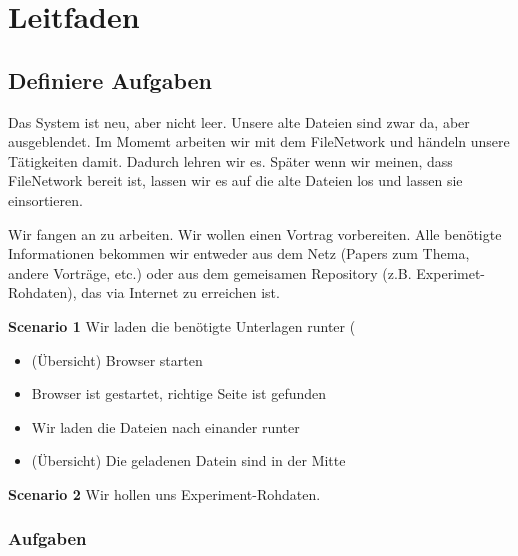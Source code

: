 
\def\mytitle{Leitfaden für User Study}
\def\myauthor{Anastasia Kazakova, Bengt Lüers}
\def\latexmode{memoir}
\def\bibliocommand{}
\def\bibliostyle{chicago}

\pagebreak

\chapter{Leitfaden}
\label{leitfaden}

\section{Definiere Aufgaben}
\label{definiereaufgaben}

Das System ist neu, aber nicht leer. Unsere alte Dateien sind zwar da, aber ausgeblendet. Im Momemt arbeiten wir mit dem FileNetwork und händeln unsere Tätigkeiten damit. Dadurch lehren wir es. Später wenn wir meinen, dass FileNetwork bereit ist, lassen wir es auf die alte Dateien los und lassen sie einsortieren. 

Wir fangen an zu arbeiten. Wir wollen einen Vortrag vorbereiten. Alle benötigte Informationen bekommen wir entweder aus dem Netz (Papers zum Thema, andere Vorträge, etc.) oder aus dem gemeisamen Repository (z.B. Experimet-Rohdaten), das via Internet zu erreichen ist.

\textbf{Scenario 1}
Wir laden die benötigte Unterlagen runter (

\begin{itemize}
\item (Übersicht) Browser starten

\item Browser ist gestartet, richtige Seite ist gefunden

\item Wir laden die Dateien nach einander runter

\item (Übersicht) Die geladenen Datein sind in der Mitte

\end{itemize}

\textbf{Scenario 2}
Wir hollen uns Experiment-Rohdaten.

\subsection{Aufgaben}
\label{aufgaben}

\pagebreak




